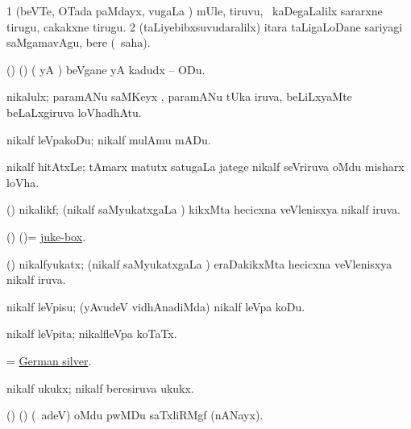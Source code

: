 \noindent
\gl{\akirx}
\bmng
\bnum
\num{1} (beVTe, OTada paMdayx, \mo vugaLa \vi) mUle, tiruvu, \mo\ kaDegaLalilx sararxne tirugu, cakakxne tirugu. 
\num{2} (taLiyebibxsuvudaralilx) itara taLigaLoDane sariyagi saMgamavAgu, bere (\sakirx\ saha). 
\enum
\emng
\eentry

\bentry
{}
\gl{\akirx}
\bmng
(\AseTxrXV) (\ashi) ( yA ) beVgane yA kadudx -- ODu. 
\emng
\eentry

\bentry
{}
\gl{\nA}
\bmng
nikalulx; paramANu saMKeyx , paramANu tUka  iruva, beLiLxyaMte beLaLxgiruva loVhadhAtu. 
\emng
\eentry

\bentry
{}
\gl{\sakirx}
\bmng
nikalf leVpakoDu; nikalf mulAmu mADu. 
\emng
\eentry

\bentry
{}
\gl{\nA}
\bmng
nikalf hitAtxLe; tAmarx matutx satugaLa jatege nikalf seVriruva oMdu misharx loVha. 
\emng
\eentry

\bentry
{}
\gl{\gu}
\bmng
(\ravi) nikalikf; (nikalf saMyukatxgaLa \vi) kikxMta hecicxna veVlenisxya nikalf iruva. 
\emng
\eentry

\bentry
{}
\gl{\nA}
\bmng
(\ame) (\AmA)= \hyperref{kandict_j.pdf}{J}{juke-box}{juke-box}. 
\emng
\eentry

\bentry
{}
\gl{\gu}
\bmng
(\ravi) nikalfyukatx; (nikalf saMyukatxgaLa \vi) eraDakikxMta hecicxna veVlenisxya nikalf iruva. 
\emng
\eentry

\bentry
{}
\gl{\sakirx}
\bmng
nikalf leVpisu; (yAvudeV vidhAnadiMda) nikalf leVpa koDu. 
\emng
\eentry

\bentry
{}
\gl{\gu}
\bmng
nikalf leVpita; nikalfleVpa koTaTx. 
\emng
\eentry

\bentry
{}
\gl{\nA}
\bmng
= \hyperref{kandict_g.pdf}{G}{German silver}{German silver}. 
\emng
\eentry

\bentry
{}
\gl{\nA}
\bmng
nikalf ukukx; nikalf beresiruva ukukx. 
\emng
\eentry

\bentry
{}
\gl{\nA}
\bmng
(\birx) (\ashi) (\bava\ adeV) oMdu pwMDu saTxliRMgf (nANayx). 
\emng
\eentry

